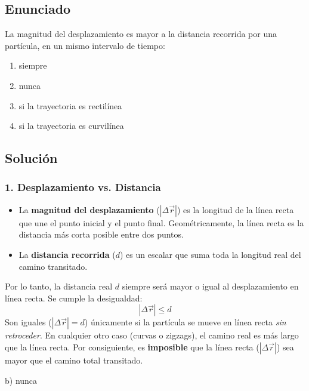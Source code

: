 \documentclass[12pt, a4paper]{article}
\begin{document}
\newpage


\subsection*{Enunciado}
La magnitud del desplazamiento es mayor a la distancia recorrida por una partícula, en un mismo intervalo de tiempo:
\begin{enumerate}[label=\alph*)]
    \item siempre
    \item nunca
    \item si la trayectoria es rectilínea
    \item si la trayectoria es curvilínea
\end{enumerate}

\subsection*{Solución}

\subsubsection*{1. Desplazamiento vs. Distancia}
\begin{itemize}
    \item La \textbf{magnitud del desplazamiento} ($|\Delta \vec{r}|$) es la longitud de la línea recta que une el punto inicial y el punto final. Geométricamente, la línea recta es la distancia más corta posible entre dos puntos.
    \item La \textbf{distancia recorrida} ($d$) es un escalar que suma toda la longitud real del camino transitado.
\end{itemize}

Por lo tanto, la distancia real $d$ siempre será mayor o igual al desplazamiento en línea recta. Se cumple la desigualdad:
$$ |\Delta \vec{r}| \le d $$
Son iguales ($|\Delta \vec{r}| = d$) únicamente si la partícula se mueve en línea recta \textit{sin retroceder}. En cualquier otro caso (curvas o zigzags), el camino real es más largo que la línea recta. Por consiguiente, es \textbf{imposible} que la línea recta ($|\Delta \vec{r}|$) sea mayor que el camino total transitado.

\begin{tcolorbox}[colback=green!5!white, colframe=green!50!black, title=Respuesta Final]
\centering \Large b) nunca
\end{tcolorbox}
\end{document}

